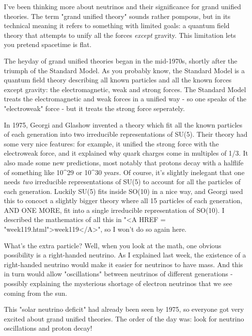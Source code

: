 

I've been thinking more about neutrinos and their significance for grand
unified theories.  The term "grand unified theory" sounds rather
pompous, but in its technical meaning it refers to something with
limited goals: a quantum field theory that attempts to unify all the
forces \emph{except} gravity.  This limitation lets you pretend spacetime
is flat.  

The heyday of grand unified theories began in the mid-1970s, shortly
after the triumph of the Standard Model.  As you probably know, the
Standard Model is a quantum field theory describing all known particles
and all the known forces except gravity: the electromagnetic, weak and
strong forces.  The Standard Model treats the electromagnetic and weak
forces in a unified way - so one speaks of the "electroweak" force -
but it treats the strong force seperately.

In 1975, Georgi and Glashow invented a theory which fit all the known
particles of each generation into two irreducible representations of
SU(5).  Their theory had some very nice features: for example, it
unified the strong force with the electroweak force, and it explained
why quark charges come in multiples of 1/3.  It also made some new
predictions, most notably that protons decay with a halflife of
something like 10^{29} or 10^{30} years.  Of course, 
it's slightly
inelegant that one needs \emph{two} 
irreducible representations of SU(5) to
account for all the particles of each generation.  Luckily SU(5) fits
inside SO(10) in a nice way, and Georgi used this to concoct a slightly
bigger theory where all 15 particles of each generation, AND ONE MORE,
fit into a single irreducible representation of SO(10).  I described the
mathematics of all this in 
"<A HREF = "week119.html">week119</A>", so I won't do so again here.

What's the extra particle?  Well, when you look at the math, one obvious
possibility is a right-handed neutrino.  As I explained last week, the
existence of a right-handed neutrino would make it easier for neutrinos
to have mass.  And this in turn would allow "oscillations" between
neutrinos of different generations - possibly explaining the mysterious
shortage of electron neutrinos that we see coming from the sun.

This "solar neutrino deficit" had already been seen by 1975, so 
everyone
got very excited about grand unified theories.  The order of the day
was: look for neutrino oscillations and proton decay!

